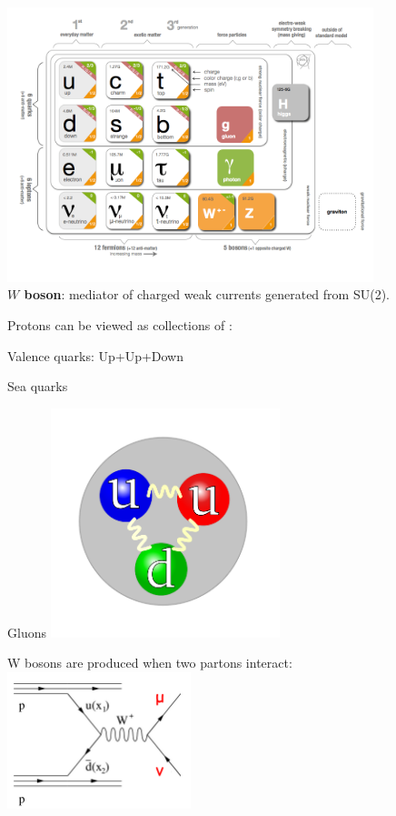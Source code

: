 {
\includegraphics[width=0.8\textwidth]{dates/mtg/figures/wz/sm} \\
\textbf{$W$ boson}: mediator of charged weak currents generated from SU(2).
}

{

\colb[T]
\centering
\iteb
\item Protons can be viewed as collections of :
\iteb
\item Valence quarks: Up+Up+Down
\item Sea quarks
\item Gluons
\itee
\itee
{}
\centering
\includegraphics[width=0.5\textwidth]{dates/mtg/figures/wz/proton}
\cole

\vspace{.3cm}
W bosons are produced when two partons interact: \\
\centering
\includegraphics[width=0.4\textwidth]{dates/mtg/figures/wz/wmunuf} 

}

